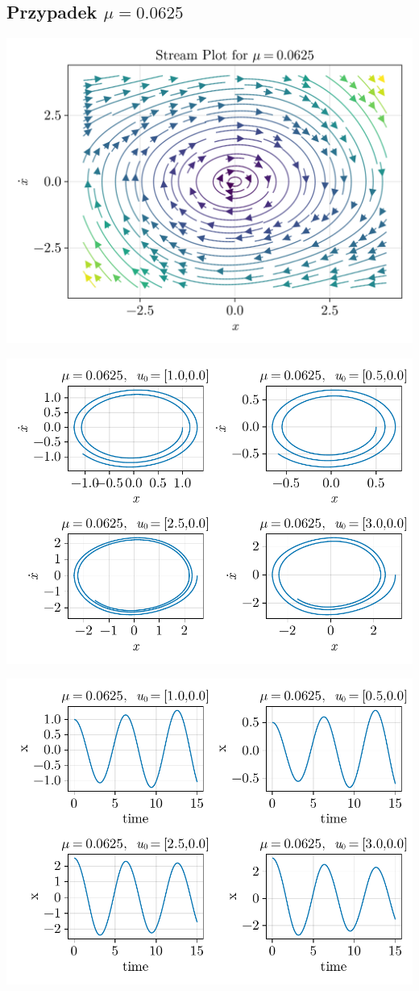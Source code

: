 \clearpage

%
%
\subsection{Przypadek $\mu = 0.0625$}
\includegraphics[width=\textwidth]{out/stream_03.png}

\includegraphics[width=\textwidth]{out/phase_03.pdf}

\includegraphics[width=\textwidth]{out/xfromt_03.pdf}

